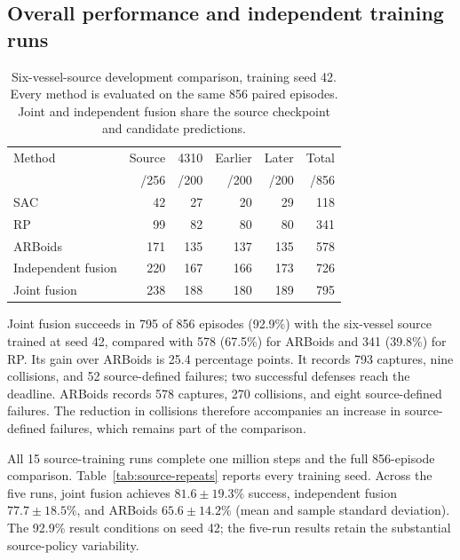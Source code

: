 \documentclass[journal]{IEEEtran}
\begin{document}
\subsection{Overall performance and independent training runs}
\begin{table}[t]
\caption{Six-vessel-source development comparison, training seed 42. Every method is evaluated on the same 856 paired episodes. Joint and independent fusion share the source checkpoint and candidate predictions.}
\label{tab:development}\centering\scriptsize
\begin{tabular}{@{}lrrrrr@{}}\toprule
Method & Source & 4310 & Earlier & Later & Total\\
 & /256 & /200 & /200 & /200 & /856\\\midrule
SAC & 42 & 27 & 20 & 29 & 118\\
RP & 99 & 82 & 80 & 80 & 341\\
ARBoids & 171 & 135 & 137 & 135 & 578\\
Independent fusion & 220 & 167 & 166 & 173 & 726\\
Joint fusion & 238 & 188 & 180 & 189 & 795\\\bottomrule
\end{tabular}
\end{table}
Joint fusion succeeds in 795 of 856 episodes (92.9\%) with the six-vessel source trained at seed 42, compared with 578 (67.5\%) for ARBoids and 341 (39.8\%) for RP. Its gain over ARBoids is 25.4 percentage points. It records 793 captures, nine collisions, and 52 source-defined failures; two successful defenses reach the deadline. ARBoids records 578 captures, 270 collisions, and eight source-defined failures. The reduction in collisions therefore accompanies an increase in source-defined failures, which remains part of the comparison.

All 15 source-training runs complete one million steps and the full 856-episode comparison. Table~\ref{tab:source-repeats} reports every training seed. Across the five runs, joint fusion achieves $81.6\pm19.3\%$ success, independent fusion $77.7\pm18.5\%$, and ARBoids $65.6\pm14.2\%$ (mean and sample standard deviation). The 92.9\% result conditions on seed 42; the five-run results retain the substantial source-policy variability.
\end{document}
